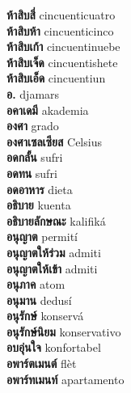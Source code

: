 \textbf{ ห้าสิบสี่  } cincuenticuatro \\
\textbf{ ห้าสิบห้า  } cincuenticinco \\
\textbf{ ห้าสิบเก้า  } cincuentinuebe \\
\textbf{ ห้าสิบเจ็ด  } cincuentishete \\
\textbf{ ห้าสิบเอ็ด  } cincuentiun \\
\textbf{ อ.  } djamars \\
\textbf{ อคาเดมี  } akademia \\
\textbf{ องศา  } grado \\
\textbf{ องศาเซลเซียส  } Celsius \\
\textbf{ อดกลั้น  } sufri \\
\textbf{ อดทน  } sufri \\
\textbf{ อดอาหาร  } dieta \\
\textbf{ อธิบาย  } kuenta \\
\textbf{ อธิบายลักษณะ  } kalifiká \\
\textbf{ อนุญาต  } permití \\
\textbf{ อนุญาตให้ร่วม  } admiti \\
\textbf{ อนุญาตให้เข้า  } admiti \\
\textbf{ อนุภาค  } atom \\
\textbf{ อนุมาน  } dedusí \\
\textbf{ อนุรักษ์  } konservá \\
\textbf{ อนุรักษ์นิยม  } konservativo \\
\textbf{ อบอุ่นใจ  } konfortabel \\
\textbf{ อพาร์ตเมนต์  } flèt \\
\textbf{ อพาร์ทเมนท์  } apartamento \\

